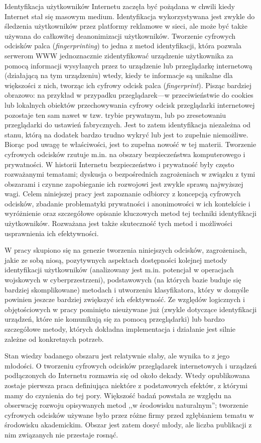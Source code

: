 Identyfikacja użytkowników Internetu zaczęła być pożądana w chwili kiedy
Internet stał się masowym medium. Identyfikacja wykorzystywana jest zwykle do
śledzenia użytkowników przez platformy reklamowe w sieci, ale może być także
używana do całkowitej deanonimizacji użytkowników. Tworzenie cyfrowych odcisków
palca (\emph{fingerprinting}) to jedna z metod identyfikacji, która pozwala
serwerom WWW jednoznacznie zidentyfikować urządzenie użytkownika za pomocą
informacji wysyłanych przez to urządzenie lub przeglądarkę internetową
(działającą na tym urządzeniu) wtedy, kiedy te informacje są unikalne dla
większości z nich, tworząc ich cyfrowy odcisk palca (\emph{fingerprint}). Pisząc
bardziej obrazowo: na przykład w przypadku przeglądarek---w przeciwieństwie do
cookies lub lokalnych obiektów przechowywania cyfrowy odcisk przeglądarki
internetowej pozostaje ten sam nawet w tzw. trybie prywatnym, lub po
zresetowaniu przeglądarki do ustawień fabrycznych. Jest to zatem identyfikacja
niezależna od stanu, którą na dodatek bardzo trudno wykryć lub jest to zupełnie
niemożliwe. Biorąc pod uwagę te właściwości, jest to zupełna nowość w tej
materii. Tworzenie cyfrowych odcisków rzutuje m.in. na obszary bezpieczeństwa
komputerowego i prywatności. W historii Internetu bezpieczeństwo i prywatność
były często rozważanymi tematami; dyskusja o bezpośrednich zagrożeniach w
związku z tymi obszarami i czynne zapobieganie ich rozwojowi jest zwykle sprawą
najwyższej wagi. Celem niniejszej pracy jest zapoznanie odbiorcy z koncepcją
cyfrowych odcisków, zbadanie problematyki prywatności i anonimowości w ich
kontekście i wyróżnienie oraz szczegółowe opisanie kluczowych metod tej techniki
identyfikacji użytkowników. Rozważana jest także skuteczność tych metod i
możliwości usprawnienia ich efektywności.

W pracy skupiono się na genezie tworzenia niniejszych odcisków, zagrożeniach,
jakie ze sobą niosą, pozytywnych aspektach dostępności kolejnej metody
identyfikacji użytkowników (analizowany jest m.in. potencjał w operacjach
wojskowych w cyberprzestrzeni), podstawowych (na których bazie buduje się
bardziej skomplikowane) metodach i utworzeniu klasyfikatora, który w domyśle
powinien jeszcze bardziej zwiększyć ich efektywność. Ze względów logicznych i
objętościowych w pracy pominięto nieużywane już (zwykle dotyczące identyfikacji
urządzeń, które nie komunikują się za pomocą przeglądarki) lub bardzo
szczegółowe metody, których dokładna implementacja i działanie jest silnie
zależne od konkretnych potrzeb.

Stan wiedzy badanego obszaru jest relatywnie słaby, ale wynika to z jego
młodości. O tworzeniu cyfrowych odcisków przeglądarek internetowych i urządzeń
podłączonych do Internetu rozmawia się od około dekady. Wtedy opublikowana
zostaje pierwsza praca definiująca niektóre z podstawowych efektów, z którymi
mamy do czynienia do tej pory. Większość badań powstała ze względu na obserwację
rozwoju opisywanych metod ,,w środowisku naturalnym''; tworzenie cyfrowych
odcisków używane było przez różne firmy przed zgłębianiem tematu w środowisku
akademickim. Obszar jest zatem dosyć młody, ale liczba publikacji z nim
związanych nie przestaje rosnąć.

